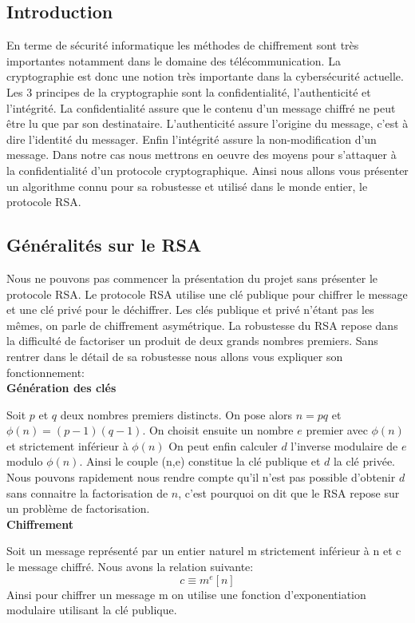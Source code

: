 \subsection{Introduction}
En terme de sécurité informatique les méthodes de chiffrement sont très importantes notamment dans le domaine des télécommunication. La cryptographie est donc une notion très importante dans la cybersécurité actuelle. Les 3 principes de la cryptographie sont la confidentialité, l'authenticité et l'intégrité.
La confidentialité assure que le contenu d'un message chiffré ne peut être lu que par son destinataire.
L'authenticité assure l'origine du message, c'est à dire l'identité du messager.
Enfin l'intégrité assure la non-modification d'un message.
Dans notre cas nous mettrons en oeuvre des moyens pour s'attaquer à la confidentialité d'un protocole cryptographique. 
Ainsi nous allons vous présenter un algorithme connu pour sa robustesse et utilisé dans le monde entier, le protocole RSA.
\subsection{Généralités sur le RSA}
Nous ne pouvons pas commencer la présentation du projet sans présenter le protocole RSA.
Le protocole RSA utilise une clé publique pour chiffrer le message et une clé privé pour le déchiffrer. Les clés publique et privé n'étant pas les mêmes, on parle de chiffrement asymétrique.
La robustesse du RSA repose dans la difficulté de factoriser un produit de deux grands nombres premiers.
Sans rentrer dans le détail de sa robustesse nous allons vous expliquer son fonctionnement:
\\

\textbf{Génération des clés}


Soit $p$ et $q$ deux nombres premiers distincts. On pose alors $n=pq$ et $\phi(n)=(p-1)(q-1)$.
On choisit ensuite un nombre $e$ premier avec $\phi(n)$ et strictement inférieur à $\phi(n)$
On peut enfin calculer $d$ l'inverse modulaire de $e$ modulo $\phi(n)$.
Ainsi le couple (n,e) constitue la clé publique et $d$ la clé privée. Nous pouvons rapidement nous rendre compte qu'il n'est pas possible d'obtenir $d$ sans connaitre la factorisation de $n$, c'est pourquoi on dit que le RSA repose sur un problème de factorisation.
\\

\textbf{Chiffrement}


Soit un message représenté par un entier naturel m strictement inférieur à n et c le message chiffré.
Nous avons la relation suivante:
\begin{equation}
\label{eq:chiffrement}
c \equiv m^e [n]
\end{equation}
Ainsi pour chiffrer un message m on utilise une fonction d'exponentiation modulaire utilisant la clé publique.
\\

